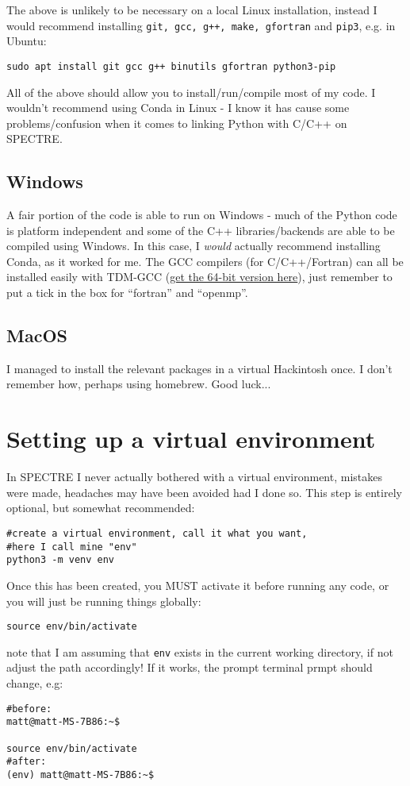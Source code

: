 			The above is unlikely to be necessary on a local Linux installation, instead I would recommend installing \texttt{git, gcc, g++, make, gfortran} and \texttt{pip3}, e.g. in Ubuntu:

			\begin{verbatim}
sudo apt install git gcc g++ binutils gfortran python3-pip
			\end{verbatim}

			All of the above should allow you to install/run/compile most of my code. I wouldn't recommend using Conda in Linux - I know it has cause some problems/confusion when it comes to linking Python with C/C++ on SPECTRE.

		\subsection{Windows}

			A fair portion of the code is able to run on Windows - much of the Python code is platform independent and some of the C++ libraries/backends are able to be compiled using Windows. In this case, I \textit{would} actually recommend installing Conda, as it worked for me. The GCC compilers (for C/C++/Fortran) can all be installed easily with TDM-GCC (\href{https://jmeubank.github.io/tdm-gcc/}{get the 64-bit version here}), just remember to put a tick in the box for ``fortran'' and ``openmp''.

		\subsection{MacOS}
		
			I managed to install the relevant packages in a virtual Hackintosh once. I don't remember how, perhaps using homebrew. Good luck...

	\section{Setting up a virtual environment}

		In SPECTRE I never actually bothered with a virtual environment, mistakes were made, headaches may have been avoided had I done so. This step is entirely optional, but somewhat recommended: 
		\begin{verbatim}
#create a virtual environment, call it what you want, 
#here I call mine "env"
python3 -m venv env
		\end{verbatim}
		Once this has been created, you MUST activate it before running any code, or you will just be running things globally:
		\begin{verbatim}
source env/bin/activate
		\end{verbatim}
		note that I am assuming that \texttt{env} exists in the current working directory, if not adjust the path accordingly! If it works, the prompt terminal prmpt should change, e.g:
		\begin{verbatim}
#before:
matt@matt-MS-7B86:~$

source env/bin/activate
#after:
(env) matt@matt-MS-7B86:~$
		\end{verbatim}


